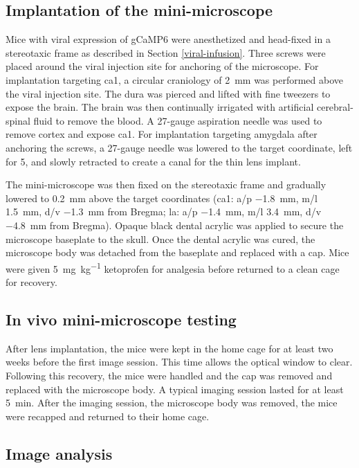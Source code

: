 \subsection{Implantation of the mini-microscope}

Mice with viral expression of gCaMP6 were anesthetized and head-fixed in a stereotaxic frame as described in Section \ref{viral-infusion}. Three screws were placed around the viral injection site for anchoring of the microscope. For implantation targeting \gls{ca1}, a circular craniology of \SI{2}{\mm} was performed above the viral injection site. The dura was pierced and lifted with fine tweezers to expose the brain. The brain was then continually irrigated with artificial cerebral-spinal fluid to remove the blood. A 27-gauge aspiration needle was used to remove cortex and expose \gls{ca1}. For implantation targeting amygdala after anchoring the screws, a 27-gauge needle was lowered to the target coordinate, left for \SI{5}{\min}, and slowly retracted to create a canal for the thin lens implant.

The mini-microscope was then fixed on the stereotaxic frame and gradually lowered to \SI{0.2}{\mm} above the target coordinates (\gls{ca1}: \gls{a/p} \SI{-1.8}{\mm}, \gls{m/l} \SI{1.5}{\mm}, \gls{d/v} \SI{-1.3}{\mm} from Bregma; \gls{la}: \gls{a/p} \SI{-1.4}{\mm}, \gls{m/l} \SI{3.4}{\mm}, \gls{d/v} \SI{-4.8}{\mm} from Bregma). Opaque black dental acrylic was applied to secure the microscope baseplate to the skull. Once the dental acrylic was cured, the microscope body was detached from the baseplate and replaced with a cap. Mice were given \SI{5}{\mg\per\kg} ketoprofen for analgesia before returned to a clean cage for recovery.

\subsection{In vivo mini-microscope testing}
After lens implantation, the mice were kept in the home cage for at least two weeks before the first image session. This time allows the optical window to clear. Following this recovery, the mice were handled and the cap was removed and replaced with the microscope body. A typical imaging session lasted for at least \SI{5}{\minute}. After the imaging session, the microscope body was removed, the mice were recapped and returned to their home cage.

\subsection{Image analysis}

